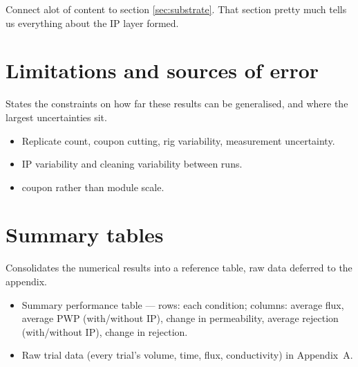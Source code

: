Connect alot of content to section \ref{sec:substrate}. That section pretty much tells us everything about the IP layer formed. 


\section{Limitations and sources of error}
\label{sec:res-limitations}
States the constraints on how far these results can be generalised, and where the largest uncertainties sit.

\begin{itemize}
  \item Replicate count, coupon cutting, rig variability, measurement uncertainty.
  \item IP variability and cleaning variability between runs.
  \item coupon rather than module scale.
\end{itemize}


\section{Summary tables}
\label{sec:res-tables}
Consolidates the numerical results into a  reference table, raw data deferred to the appendix.

\begin{itemize}
  \item Summary performance table --- rows: each condition; columns: average flux, average PWP (with/without IP), change in permeability, average rejection (with/without IP), change in rejection.
  \item Raw trial data (every trial's volume, time, flux, conductivity) in Appendix~A.
\end{itemize}
